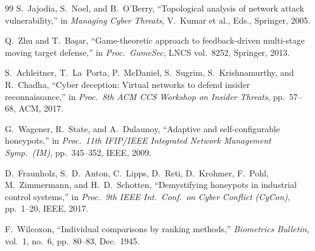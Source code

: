 \documentclass[journal]{IEEEtran}
\begin{document}
\begin{thebibliography}{99}
S.~Jajodia, S.~Noel, and B.~O'Berry,
``Topological analysis of network attack vulnerability,''
in \emph{Managing Cyber Threats}, V.~Kumar et al., Eds.,
Springer, 2005.

Q.~Zhu and T.~Ba\c{s}ar,
``Game-theoretic approach to feedback-driven multi-stage moving
target defense,''
in \emph{Proc.\ GameSec}, LNCS vol.~8252, Springer, 2013.

S.~Achleitner, T.~La~Porta, P.~McDaniel, S.~Sugrim,
S.~Krishnamurthy, and R.~Chadha,
``Cyber deception: Virtual networks to defend insider
reconnaissance,''
in \emph{Proc.\ 8th ACM CCS Workshop on Insider Threats},
pp.~57--68, ACM, 2017.

G.~Wagener, R.~State, and A.~Dulaunoy,
``Adaptive and self-configurable honeypots,''
in \emph{Proc.\ 11th IFIP/IEEE Integrated Network Management
Symp.\ (IM)}, pp.~345--352, IEEE, 2009.

D.~Fraunholz, S.~D.~Anton, C.~Lipps, D.~Reti, D.~Krohmer,
F.~Pohl, M.~Zimmermann, and H.~D.~Schotten,
``Demystifying honeypots in industrial control systems,''
in \emph{Proc.\ 9th IEEE Int.\ Conf.\ on Cyber Conflict (CyCon)},
pp.~1--20, IEEE, 2017.

F.~Wilcoxon,
``Individual comparisons by ranking methods,''
\emph{Biometrics Bulletin}, vol.~1, no.~6,
pp.~80--83, Dec.\ 1945.

\end{thebibliography}
\end{document}
